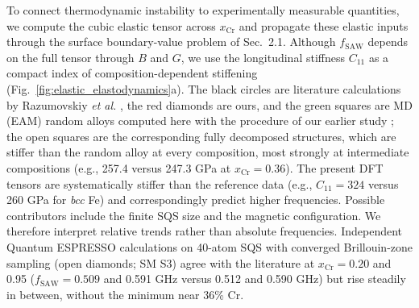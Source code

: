 \documentclass[final,3p,times]{elsarticle}
\begin{document}
To connect thermodynamic instability to experimentally measurable quantities, we compute the cubic elastic tensor across $x_{\mathrm{Cr}}$ and propagate these elastic inputs through the surface boundary-value problem of Sec.~2.1. Although $f_{\mathrm{SAW}}$ depends on the full tensor through $B$ and $G$, we use the longitudinal stiffness $C_{11}$ as a compact index of composition-dependent stiffening (Fig.~\ref{fig:elastic_elastodynamics}a). The black circles are literature calculations by Razumovskiy \textit{et al.} \cite{razumovskiy2011first}, the red diamonds are ours, and the green squares are MD (EAM) random alloys computed here with the procedure of our earlier study \cite{al2023detecting}; the open squares are the corresponding fully decomposed structures, which are stiffer than the random alloy at every composition, most strongly at intermediate compositions (e.g., 257.4 versus 247.3 GPa at $x_{\mathrm{Cr}}=0.36$). The present DFT tensors are systematically stiffer than the reference data (e.g., $C_{11}=324$ versus 260 GPa for \textit{bcc} Fe) and correspondingly predict higher frequencies. Possible contributors include the finite SQS size and the magnetic configuration. We therefore interpret relative trends rather than absolute frequencies. Independent Quantum ESPRESSO calculations on 40-atom SQS with converged Brillouin-zone sampling (open diamonds; SM S3) agree with the literature at $x_{\mathrm{Cr}}=0.20$ and 0.95 ($f_{\mathrm{SAW}}=0.509$ and 0.591 GHz versus 0.512 and 0.590 GHz) but rise steadily in between, without the minimum near 36\% Cr.
\end{document}
